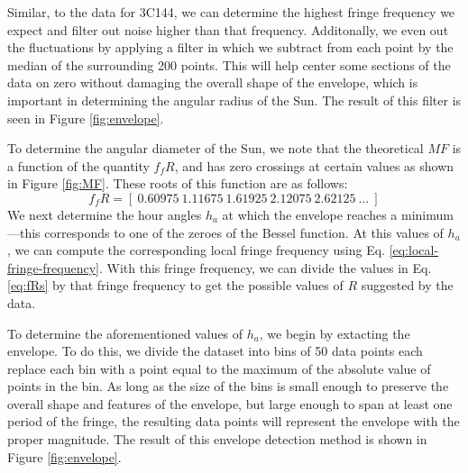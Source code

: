 \documentclass[12pt]{article}
\begin{document}
Similar, to the data for 3C144, we can determine the highest fringe frequency we expect and filter out noise higher than that frequency. Additonally, we even out the fluctuations by applying a filter in which we subtract from each point by the median of the surrounding 200 points. This will help center some sections of the data on zero without damaging the overall shape of the envelope, which is important in determining the angular radius of the Sun. The result of this filter is seen in Figure \ref{fig:envelope}.

To determine the angular diameter of the Sun, we note that the theoretical $MF$ is a function of the quantity $f_f R$, and has zero crossings at certain values as shown in Figure \ref{fig:MF}. These roots of this function are as follows:
\begin{equation}
f_f R = [ \ 0.60975\  1.11675\  1.61925 \ 2.12075\  2.62125\ \ldots\ ] \label{eq:fRs}
\end{equation}
We next determine the hour angles $h_a$ at which the envelope reaches a minimum---this corresponds to one of the zeroes of the Bessel function. At this values of $h_a$, we can compute the corresponding local fringe frequency using Eq. \ref{eq:local-fringe-frequency}. With this fringe frequency, we can divide the values in Eq. \ref{eq:fRs} by that fringe frequency to get the possible values of $R$ suggested by the data.

To determine the aforementioned values of $h_a$, we begin by extacting the envelope. To do this, we divide the dataset into bins of 50 data points each replace each bin with a point equal to the maximum of the absolute value of points in the bin. As long as the size of the bins is small enough to preserve the overall shape and features of the envelope, but large enough to span at least one period of the fringe, the resulting data points will represent the envelope with the proper magnitude. The result of this envelope detection method is shown in Figure \ref{fig:envelope}.
\end{document}
